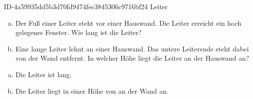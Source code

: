 \begin{exercise}
      {ID-4a59935dd5b3d70fd9474fec3845306c9716bf24}
      {Leiter}
  \ifproblem\problem\par
    \begin{enumerate}[a)]
      \item Der Fuß einer Leiter steht  vor einer Hauswand. Die Leiter
            erreicht ein  hoch gelegenes Fenster. Wie lang ist die Leiter?
      \item Eine  lange Leiter lehnt an einer Hauswand. Das untere
            Leiterende steht dabei  von der Wand entfernt. In welcher
            Höhe liegt die Leiter an der Hauswand an?
    \end{enumerate}
  \fi
  \ifoutcome\outcome\par
    \begin{enumerate}[a)]
      \item Die Leiter ist  lang.
      \item Die Leiter liegt in einer Höhe von  an der Wand an.
    \end{enumerate}
  \fi
\end{exercise}
